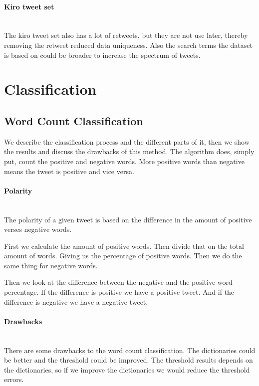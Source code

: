 \paragraph{Kiro tweet set}
\hspace{0pt}\\
The kiro tweet set also has a lot of retweets, but they are not use later,
thereby removing the retweet reduced data uniqueness. Also the search terms the
dataset is based on could be broader to increase the spectrum of tweets.  
%

\section{Classification}\label{sentiment:classification}
\subsection{Word Count Classification}\label{sentiment:word_count_classification}
We describe the classification process and the different parts of it, then we
show the results and discuss the drawbacks of this method. The algorithm does,
simply put, count the positive and negative words. More positive words than
negative means the tweet is positive and vice versa. 

\paragraph{Polarity} 
\hspace{0pt}\\ 
The polarity of a given tweet is based on the difference in the amount of
positive verses negative words. 

First we calculate the amount of positive words. Then divide that on the total
amount of words. Giving us the percentage of positive words. Then we do the same thing for negative words.

Then we look at the difference between the negative and the positive word
percentage. If the difference is positive we have a positive tweet. And if the
difference is negative we have a negative tweet.

\paragraph{Drawbacks}
\hspace{0pt}\\
There are some drawbacks to the word count classification. The dictionaries
could be better and the threshold could be improved. The threshold results
depends on the dictionaries, so if we improve the dictionaries we would reduce
the threshold errors.

